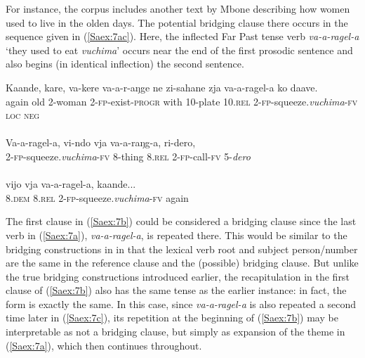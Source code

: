 \documentclass[output=paper]{LSP/langsci}
\begin{document}
For instance, the corpus includes another text by Mbone describing how women used to live in the olden days. The potential bridging clause there occurs in the sequence given in (\ref{Saex:7ac}). Here, the inflected Far Past tense verb \textit{va-a-ragel-a} `they used to eat \textit{vuchima}' occurs near the end of the first prosodic sentence and also begins (in identical inflection) the second sentence. 
 
\begin{exe}
\ex \label{Saex:7ac}
\begin{xlist}
\ex \label{Saex:7a}
\gll Kaande,  kare,  va-kere   va-a-r-aŋge     ne   zi-sahane  zja   va-a-ragel-a       ko   daave. \\
again    old  2-woman  2-\textsc{fp}-exist-\textsc{progr}  with  10-plate  10.\textsc{rel}  2-\textsc{fp}-squeeze.\textit{vuchima}-\textsc{fv}  \textsc{loc}  \textsc{neg}\\
\glt {}\\
\ex \label{Saex:7b}
\gll Va-a-ragel-a,       vi-ndo   vja   va-a-raŋg-a,  ri-dero,  \\     	       
   2-\textsc{fp}-squeeze.\textit{vuchima}-\textsc{fv} 8-thing  8.\textsc{rel}  2-\textsc{fp-}call-\textsc{fv}  5-\textit{dero}  \\
   \glt {} \\
\ex \label{Saex:7c}
\gll vijo   vja   va-a-ragel-a,       kaande...\\     	       
    8.\textsc{dem}  8.\textsc{rel}  2-\textsc{fp}-squeeze.\textit{vuchima}-\textsc{fv}  again\\
\glt {} 
\end{xlist}
\end{exe}



The first clause in (\ref{Saex:7b}) could be considered a bridging clause since the last verb in (\ref{Saex:7a}), \textit{va-a-ragel-a}, is repeated there. This would be similar to the bridging constructions in  in that the lexical verb root and subject person/number are the same in the reference clause and the (possible) bridging clause. But unlike the true bridging constructions introduced earlier, the recapitulation in the first clause of (\ref{Saex:7b}) also has the same tense as the earlier instance: in fact, the form is exactly the same. In this case, since \textit{va-a-ragel-a} is also repeated a second time later in (\ref{Saex:7c}), its repetition at the beginning of (\ref{Saex:7b}) may be interpretable as not a bridging clause, but simply as expansion of the theme in (\ref{Saex:7a}), which then continues throughout. 
\end{document}
